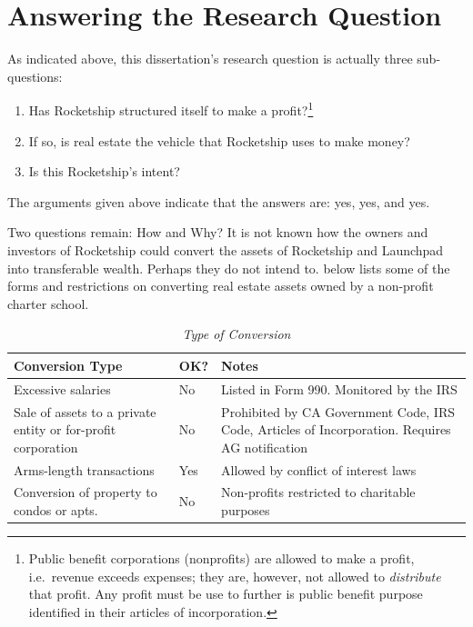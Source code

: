 \section{Answering the Research Question}%
\label{sec:answ-rese-quest}\indent%

As indicated above, this dissertation's research question is actually three sub-questions:
\begin{enumerate}
  \item Has Rocketship structured itself to make a profit?\footnote{Public benefit corporations (nonprofits) are allowed to make a profit, i.e.\ revenue exceeds expenses; they are, however, not allowed to \textit{distribute} that profit. Any profit must be use to further is public benefit purpose identified in their articles of incorporation.}
  \item If so, is real estate the vehicle that Rocketship uses to make money?
  \item Is this Rocketship's intent?
\end{enumerate}

The arguments given above indicate that the answers are: yes, yes, and yes.

Two questions remain: How and Why? It is not known how the owners and investors of Rocketship could convert the assets of Rocketship and Launchpad into transferable wealth. Perhaps they do not intend to.  below lists some of the forms and restrictions on converting real estate assets owned by a non-profit charter school.

\noindent%
\begin{table}[hbtp]
  \caption[Type of Conversion]{\textit{Type of Conversion}}%
  \label{tab:type_conversion}\OnehalfSpacing%
    \begin{tabulary}{\textwidth}{LLL}
    \toprule
    \textbf{Conversion Type} & \textbf{OK?} & \textbf{Notes} \\
    \midrule
    Excessive salaries & No & Listed in Form 990. Monitored by the IRS \vspace{6pt} \\
    Sale of assets to a private entity or for-profit corporation & No & Prohibited by CA Government Code, IRS Code, Articles of Incorporation. Requires AG notification \vspace{6pt} \\
    Arms-length transactions & Yes & Allowed by conflict of interest laws \vspace{6pt} \\
    Conversion of property to condos or apts. & No & Non-profits restricted to charitable purposes \\
    \bottomrule
  \end{tabulary}
\end{table}

